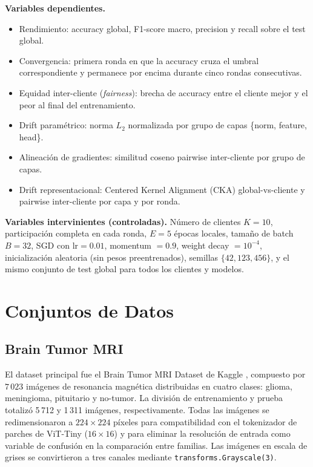 \textbf{Variables dependientes.}
\begin{itemize}
  \item Rendimiento: accuracy global, F1-score macro, precision y recall sobre el test global.
  \item Convergencia: primera ronda en que la accuracy cruza el umbral correspondiente y
    permanece por encima durante cinco rondas consecutivas.
  \item Equidad inter-cliente (\textit{fairness}): brecha de accuracy entre el cliente mejor
    y el peor al final del entrenamiento.
  \item Drift paramétrico: norma $L_2$ normalizada por grupo de capas \{norm, feature, head\}.
  \item Alineación de gradientes: similitud coseno pairwise inter-cliente por grupo de capas.
  \item Drift representacional: Centered Kernel Alignment (CKA) global-vs-cliente y pairwise
    inter-cliente por capa y por ronda.
\end{itemize}

\textbf{Variables intervinientes (controladas).}
Número de clientes $K = 10$, participación completa en cada ronda, $E = 5$ épocas locales,
tamaño de batch $B = 32$, SGD con $\text{lr} = 0.01$, momentum $= 0.9$, weight decay $= 10^{-4}$,
inicialización aleatoria (sin pesos preentrenados), semillas $\{42, 123, 456\}$, y el mismo
conjunto de test global para todos los clientes y modelos.

\section{Conjuntos de Datos}

\subsection{Brain Tumor MRI}

El dataset principal fue el Brain Tumor MRI Dataset de Kaggle \cite{msoud_nickparvar_2026},
compuesto por $7\,023$ imágenes de resonancia magnética distribuidas en cuatro clases:
glioma, meningioma, pituitario y no-tumor. La división de entrenamiento y prueba totalizó
5\,712 y 1\,311 imágenes, respectivamente. Todas las imágenes se redimensionaron a
$224 \times 224$ píxeles para compatibilidad con el tokenizador de parches de ViT-Tiny
($16 \times 16$) y para eliminar la resolución de entrada como variable de confusión en la
comparación entre familias. Las imágenes en escala de grises se convirtieron a tres canales
mediante \texttt{transforms.Grayscale(3)}.

